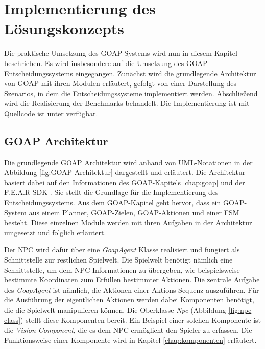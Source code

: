 \chapter{Implementierung des Lösungskonzepts}
\label{chap:implementierung lk}

Die praktische Umsetzung des GOAP-Systems wird nun in diesem Kapitel beschrieben. Es wird insbesondere auf die Umsetzung des GOAP-Entscheidungssystems eingegangen. Zunächst wird die grundlegende Architektur von GOAP mit ihren Modulen erläutert, gefolgt von einer Darstellung des Szenarios, in dem die Entscheidungssysteme implementiert werden. Abschlie\ss{}end wird die Realisierung der Benchmarks behandelt. Die Implementierung ist mit Quellcode ist unter \autocite{oleg} verfügbar.





\section{GOAP Architektur}
\label{chap:goap architektur}

Die grundlegende GOAP Architektur wird anhand von UML-Notationen in der Abbildung \ref{fig:GOAP Architektur} dargestellt und erläutert. Die Architektur basiert dabei auf den Informationen des GOAP-Kapitels \ref{chap:goap} und der F.E.A.R SDK \autocite{fearsdk}. Sie stellt die Grundlage für die Implementierung des Entscheidungssystems. Aus dem GOAP-Kapitel geht hervor, dass ein GOAP-System aus einem Planner, GOAP-Zielen, GOAP-Aktionen und einer FSM besteht. Diese einzelnen Module werden mit ihren Aufgaben in der Architektur umgesetzt und folglich erläutert.

Der NPC wird dafür über eine \textit{GoapAgent} Klasse realisiert und fungiert als Schnittstelle zur restlichen Spielwelt. Die Spielwelt benötigt nämlich eine Schnittstelle, um dem NPC Informationen zu übergeben, wie beispielsweise bestimmte Koordinaten zum Erfüllen bestimmter Aktionen. Die zentrale Aufgabe des \textit{GoapAgent} ist nämlich, die Aktionen einer Aktions-Sequenz auszuführen. Für die Ausführung der eigentlichen Aktionen werden dabei Komponenten benötigt, die die Spielwelt manipulieren können. Die Oberklasse \textit{Npc} (Abbildung \ref{fig:npc class}) stellt diese Komponenten bereit. Ein Beispiel einer solchen Komponente ist die \textit{Vision-Component}, die es dem NPC ermöglicht den Spieler zu erfassen. Die Funktionsweise einer Komponente wird in Kapitel \ref{chap:komponenten} erläutert.

